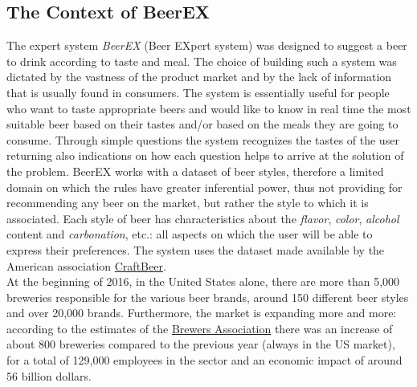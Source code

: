 \documentclass[12pt]{article}
\begin{document}
\subsection{The Context of BeerEX}
The expert system \textit{BeerEX} (Beer EXpert system) was designed to suggest a beer to drink according to taste and meal. The choice of building such a system was dictated by the vastness of the product market and by the lack of information that is usually found in consumers. The system is essentially useful for people who want to taste appropriate beers and would like to know in real time the most suitable beer based on their tastes and/or based on the meals they are going to consume. Through simple questions the system recognizes the tastes of the user returning also indications on how each question helps to arrive at the solution of the problem. BeerEX works with a dataset of beer styles, therefore a limited domain on which the rules have greater inferential power, thus not providing for recommending any beer on the market, but rather the style to which it is associated. Each style of beer has characteristics about the \textit{flavor}, \textit{color}, \textit{alcohol} content and \textit{carbonation}, etc.: all aspects on which the user will be able to express their preferences. The system uses the dataset made available by the American association \href{https://www.craftbeer.com}{CraftBeer}. \\At the beginning of 2016, in the United States alone, there are more than 5,000 breweries responsible for the various beer brands, around 150 different beer styles and over 20,000 brands. Furthermore, the market is expanding more and more: according to the estimates of the \href{https://www.brewersassociation.org}{Brewers Association} there was an increase of about 800 breweries compared to the previous year (always in the US market), for a total of 129,000 employees in the sector and an economic impact of around 56 billion dollars.
\end{document}
